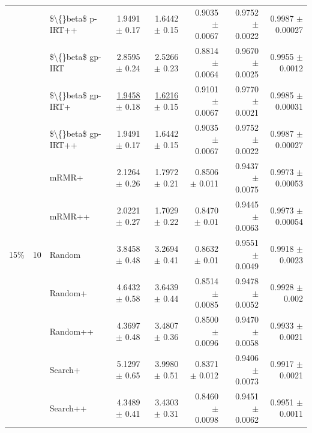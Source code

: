 \begin{longtable}{llp{}rrrrr}
 &  & \$\textbackslash\{\}beta\$ p-IRT++ & 1.9491 {\scriptsize $\pm$ 0.17} & 1.6442 {\scriptsize $\pm$ 0.15} & 0.9035 {\scriptsize $\pm$ 0.0067} & 0.9752 {\scriptsize $\pm$ 0.0022} & 0.9987 {\scriptsize $\pm$ 0.00027} \\
 &  & \$\textbackslash\{\}beta\$ gp-IRT & 2.8595 {\scriptsize $\pm$ 0.24} & 2.5266 {\scriptsize $\pm$ 0.23} & 0.8814 {\scriptsize $\pm$ 0.0064} & 0.9670 {\scriptsize $\pm$ 0.0025} & 0.9955 {\scriptsize $\pm$ 0.0012} \\
 &  & \$\textbackslash\{\}beta\$ gp-IRT+ & \underline{1.9458} {\scriptsize $\pm$ 0.18} & \underline{1.6216} {\scriptsize $\pm$ 0.15} & 0.9101 {\scriptsize $\pm$ 0.0067} & 0.9770 {\scriptsize $\pm$ 0.0021} & 0.9985 {\scriptsize $\pm$ 0.00031} \\
 &  & \$\textbackslash\{\}beta\$ gp-IRT++ & 1.9491 {\scriptsize $\pm$ 0.17} & 1.6442 {\scriptsize $\pm$ 0.15} & 0.9035 {\scriptsize $\pm$ 0.0067} & 0.9752 {\scriptsize $\pm$ 0.0022} & 0.9987 {\scriptsize $\pm$ 0.00027} \\
 &  & mRMR+ & 2.1264 {\scriptsize $\pm$ 0.26} & 1.7972 {\scriptsize $\pm$ 0.21} & 0.8506 {\scriptsize $\pm$ 0.011} & 0.9437 {\scriptsize $\pm$ 0.0075} & 0.9973 {\scriptsize $\pm$ 0.00053} \\
 &  & mRMR++ & 2.0221 {\scriptsize $\pm$ 0.27} & 1.7029 {\scriptsize $\pm$ 0.22} & 0.8470 {\scriptsize $\pm$ 0.01} & 0.9445 {\scriptsize $\pm$ 0.0063} & 0.9973 {\scriptsize $\pm$ 0.00054} \\
\midrule
15\% & 10 & Random & 3.8458 {\scriptsize $\pm$ 0.48} & 3.2694 {\scriptsize $\pm$ 0.41} & 0.8632 {\scriptsize $\pm$ 0.01} & 0.9551 {\scriptsize $\pm$ 0.0049} & 0.9918 {\scriptsize $\pm$ 0.0023} \\
 &  & Random+ & 4.6432 {\scriptsize $\pm$ 0.58} & 3.6439 {\scriptsize $\pm$ 0.44} & 0.8514 {\scriptsize $\pm$ 0.0085} & 0.9478 {\scriptsize $\pm$ 0.0052} & 0.9928 {\scriptsize $\pm$ 0.002} \\
 &  & Random++ & 4.3697 {\scriptsize $\pm$ 0.48} & 3.4807 {\scriptsize $\pm$ 0.36} & 0.8500 {\scriptsize $\pm$ 0.0096} & 0.9470 {\scriptsize $\pm$ 0.0058} & 0.9933 {\scriptsize $\pm$ 0.0021} \\
 &  & Search+ & 5.1297 {\scriptsize $\pm$ 0.65} & 3.9980 {\scriptsize $\pm$ 0.51} & 0.8371 {\scriptsize $\pm$ 0.012} & 0.9406 {\scriptsize $\pm$ 0.0073} & 0.9917 {\scriptsize $\pm$ 0.0021} \\
 &  & Search++ & 4.3489 {\scriptsize $\pm$ 0.41} & 3.4303 {\scriptsize $\pm$ 0.31} & 0.8460 {\scriptsize $\pm$ 0.0098} & 0.9451 {\scriptsize $\pm$ 0.0062} & 0.9951 {\scriptsize $\pm$ 0.0011} \\

\end{longtable}
